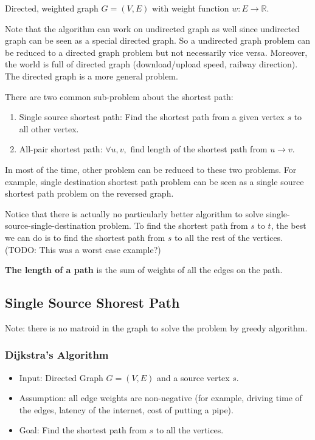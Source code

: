  Directed, weighted graph $G = (V, E)$ with weight function $w: E \rightarrow \mathbb{R}$.
 
 Note that the algorithm can work on undirected graph as well since undirected graph can be seen as a special directed graph. So a undirected graph problem can be reduced to a directed graph problem but not necessarily vice versa. Moreover, the world is full of directed graph (download/upload speed, railway direction). The directed graph is a more general problem. 

There are two common sub-problem about the shortest path:
\begin{enumerate}
	\item Single source shortest path: Find the shortest path from a given vertex $s$ to all other vertex.
	\item All-pair shortest path: $\forall u, v,$ find length of the shortest path from $u \rightarrow v$.
\end{enumerate}
In most of the time, other problem can be reduced to these two problems. For example, single destination shortest path problem can be seen as a single source shortest path problem on the reversed graph.

Notice that there is actually no particularly better algorithm to solve single-source-single-destination problem. To find the shortest path from $s$ to $t$, the best we can do is to find the shortest path from $s$ to all the rest of the vertices. (TODO: This was a worst case example?)

\begin{definition}
	\textbf{The length of a path} is the sum of weights of all the edges on the path.
\end{definition}

 \subsection{Single Source Shorest Path}
Note: there is no matroid in the graph to solve the problem by greedy algorithm.

\subsubsection{Dijkstra's Algorithm}
\begin{itemize}
	\item Input: Directed Graph $G = (V, E)$ and a source vertex $s$.
	\item Assumption: all edge weights are non-negative (for example, driving time of the edges, latency of the internet, cost of putting a pipe).
	\item Goal: Find the shortest path from $s$ to all the vertices.
\end{itemize}

